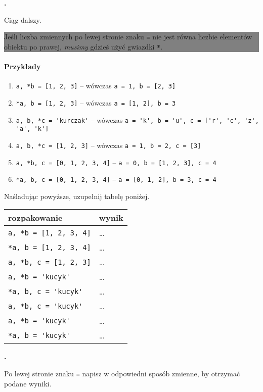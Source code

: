 \documentclass[a4paper]{article}
\newcommand{\important}[1]{
    \begin{center}\colorbox{gray}{
        \begin{minipage}[t]{0.9\textwidth}{#1}
        \end{minipage}
    }
    \end{center}
}
\begin{document}
\textbf{.}\addtocounter{zadanie}{1} Ciąg dalszy.

\important{Jeśli liczba zmiennych po lewej stronie znaku \texttt{=} nie jest równa liczbie elementów obiektu po prawej, \emph{musimy} gdzieś użyć gwiazdki \texttt{*}.}

\paragraph{Przykłady}

\begin{enumerate}[]
    \item \verb|a, *b = [1, 2, 3]| -- wówczas \verb|a = 1, b = [2, 3]|
    \item \verb|*a, b = [1, 2, 3]| -- wówczas \verb|a = [1, 2], b = 3|
    \item \verb|a, b, *c = 'kurczak'| -- wówczas \verb|a = 'k', b = 'u', c = ['r', 'c', 'z', 'a', 'k']|
    \item \verb|a, b, *c = [1, 2, 3]| -- wówczas \verb|a = 1, b = 2, c = [3]|
    \item \verb|a, *b, c = [0, 1, 2, 3, 4]| -- \verb|a = 0, b = [1, 2, 3], c = 4|
    \item \verb|*a, b, c = [0, 1, 2, 3, 4]| -- \verb|a = [0, 1, 2], b = 3, c = 4|
\end{enumerate}

Naśladując powyższe, uzupełnij tabelę poniżej.

\begin{tabular}{p{}|p{}}
\textsf{rozpakowanie} & \textsf{wynik} \\\hline
\verb|a, *b = [1, 2, 3, 4]| & \dots \\
\verb|*a, b = [1, 2, 3, 4]| & \dots \\
\verb|a, *b, c = [1, 2, 3]| & \dots \\
\verb|a, *b = 'kucyk'| & \dots \\
\verb|*a, b, c = 'kucyk'| & \dots \\
\verb|a, *b, c = 'kucyk'| & \dots \\
\verb|a, *b = 'kucyk'| & \dots \\
\verb|*a, b = 'kucyk'| & \dots \\
\end{tabular}

\textbf{.}\addtocounter{zadanie}{1} Po lewej stronie znaku \verb|=| napisz w odpowiedni sposób zmienne, by otrzymać podane wyniki.
\end{document}
